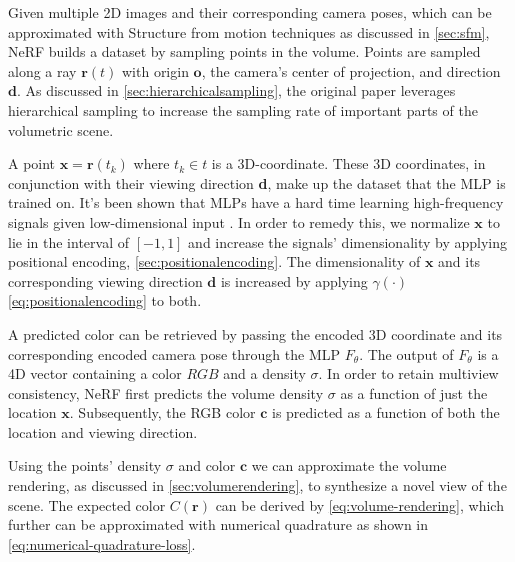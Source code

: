 Given multiple 2D images and their corresponding camera poses, which can be approximated with Structure from motion techniques as discussed in \autoref{sec:sfm}, NeRF builds a dataset by sampling points in the volume. Points are sampled along a ray $\pmb{r}(t)$ with origin $\textbf{o}$, the camera's center of projection, and direction $\textbf{d}$. As discussed in \autoref{sec:hierarchicalsampling}, the original paper leverages hierarchical sampling to increase the sampling rate of important parts of the volumetric scene.





A point $\pmb{x} = \pmb{r}(t_k)$ where $t_k \in t$ is a 3D-coordinate. These 3D coordinates, in conjunction with their viewing direction \textbf{d}, make up the dataset that the MLP is trained on. It's been shown that MLPs have a hard time learning high-frequency signals given low-dimensional input \cite{tancik_fourier_2020}. In order to remedy this, we normalize $\textbf{x}$ to lie in the interval of $[-1, 1]$ and increase the signals' dimensionality by applying positional encoding, \autoref{sec:positionalencoding}. The dimensionality of $\pmb{x}$ and its corresponding viewing direction $\pmb{d}$ is increased by applying $\gamma(\cdot)$ \autoref{eq:positionalencoding} to both.



A predicted color can be retrieved by passing the encoded 3D coordinate and its corresponding encoded camera pose through the MLP $F_{\theta}$. The output of $F_\theta$ is a 4D vector containing a color $RGB$ and a density $\sigma$. In order to retain multiview consistency, NeRF first predicts the volume density $\sigma$ as a function of just the location $\textbf{x}$. Subsequently, the RGB color $\pmb{c}$ is predicted as a function of both the location and viewing direction.


Using the points' density $\sigma$ and color $\pmb{c}$ we can approximate the volume rendering, as discussed in \autoref{sec:volumerendering}, to synthesize a novel view of the scene. The expected color $C(\pmb{r})$ can be derived by \autoref{eq:volume-rendering}, which further can be approximated with numerical quadrature as shown in \autoref{eq:numerical-quadrature-loss}.

